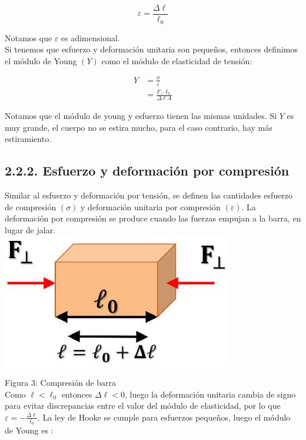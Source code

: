 \documentclass[10pt]{article}
\begin{document}
\begin{equation*}
\varepsilon=\frac{\Delta \ell}{\ell_{0}} \tag{3}
\end{equation*}


Notamos que $\varepsilon$ es adimensional.\\
Si tenemos que esfuerzo y deformación unitaria son pequeños, entonces definimos el módulo de Young $(Y)$ como el módulo de elasticidad de tensión:

$$
\begin{aligned}
Y & =\frac{\sigma}{\varepsilon} \\
& =\frac{F_{\perp} \ell_{0}}{\Delta \ell A}
\end{aligned}
$$

Notamos que el módulo de young y esfuerzo tienen las mismas unidades. Si $Y$ es muy grande, el cuerpo no se estira mucho, para el caso contrario, hay más estiramiento.

\subsection*{2.2.2. Esfuerzo y deformación por compresión}
Similar al esfuerzo y deformación por tensión, se definen las cantidades esfuerzo de compresión $(\sigma)$ y deformación unitaria por compresión $(\varepsilon)$. La deformación por compresión se produce cuando las fuerzas empujan a la barra, en lugar de jalar.\\
\includegraphics[max width=\textwidth, center]{2025_04_28_a9941da8947ada55c6c9g-04(1)}

Figura 3: Compresión de barra\\
Como $\ell<\ell_{0}$ entonces $\Delta \ell<0$, luego la deformación unitaria cambia de signo para evitar discrepancias entre el valor del módulo de elasticidad, por lo que $\varepsilon=-\frac{\Delta \ell}{\ell_{0}}$. La ley de Hooke se cumple para esfuerzos pequeños, luego el módulo de Young es :
\end{document}
